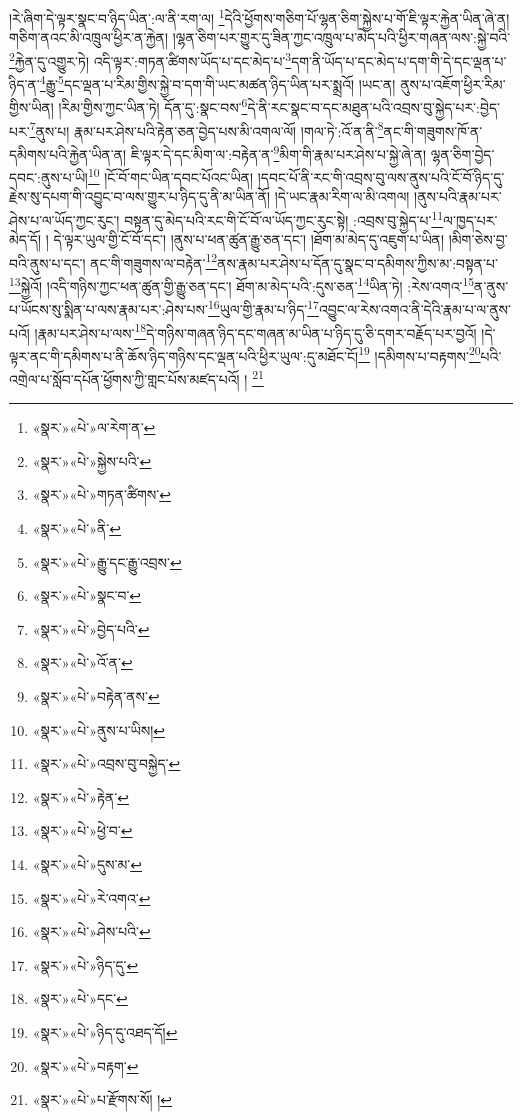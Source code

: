 །རེ་ཞིག་དེ་ལྟར་སྣང་བ་ཉིད་ཡིན་:ལ་ནི་རག་ལ། \footnote{«སྣར་»«པེ་»ལ་རེག་ན་}དེའི་ཕྱོགས་གཅིག་པོ་ལྷན་ཅིག་སྐྱེས་པ་གོ་ཇི་ལྟར་རྐྱེན་ཡིན་ཞེ་ན། གཅིག་ནའང་མི་འཁྲུལ་ཕྱིར་ན་རྐྱེན། །ལྷན་ཅིག་པར་གྱུར་དུ་ཟིན་ཀྱང་འཁྲུལ་པ་མེད་པའི་ཕྱིར་གཞན་ལས་:སྐྱེ་བའི་\footnote{«སྣར་»«པེ་»སྐྱེས་པའི་}རྐྱེན་དུ་འགྱུར་ཏེ། འདི་ལྟར་:གཏན་ཚིགས་ཡོད་པ་དང་མེད་པ་\footnote{«སྣར་»«པེ་»གཏན་ཚིགས་}དག་ནི་ཡོད་པ་དང་མེད་པ་དག་གི་དེ་དང་ལྡན་པ་ཉིད་ན་\footnote{«སྣར་»«པེ་»ནི་}རྒྱུ་\footnote{«སྣར་»«པེ་»རྒྱུ་དང་རྒྱུ་འབྲས་}དང་ལྡན་པ་རིམ་གྱིས་སྐྱེ་བ་དག་གི་ཡང་མཚན་ཉིད་ཡིན་པར་སྨྲའོ། །ཡང་ན། ནུས་པ་འཇོག་ཕྱིར་རིམ་གྱིས་ཡིན། །རིམ་གྱིས་ཀྱང་ཡིན་ཏེ། དོན་དུ་:སྣང་བས་\footnote{«སྣར་»«པེ་»སྣང་བ་}དེ་ནི་རང་སྣང་བ་དང་མཐུན་པའི་འབྲས་བུ་སྐྱེད་པར་:བྱེད་པར་\footnote{«སྣར་»«པེ་»བྱེད་པའི་}ནུས་པ། རྣམ་པར་ཤེས་པའི་རྟེན་ཅན་བྱེད་པས་མི་འགལ་ལོ། །གལ་ཏེ་:འོ་ན་ནི་\footnote{«སྣར་»«པེ་»འོ་ན་}ནང་གི་གཟུགས་ཁོ་ན་དམིགས་པའི་རྐྱེན་ཡིན་ན། ཇི་ལྟར་དེ་དང་མིག་ལ་:བརྟེན་ན་\footnote{«སྣར་»«པེ་»བརྟེན་ནས་}མིག་གི་རྣམ་པར་ཤེས་པ་སྐྱེ་ཞེ་ན། ལྷན་ཅིག་བྱེད་དབང་:ནུས་པ་ཡི།\footnote{«སྣར་»«པེ་»ནུས་པ་ཡིས།} །ངོ་བོ་གང་ཡིན་དབང་པོའང་ཡིན། །དབང་པོ་ནི་རང་གི་འབྲས་བུ་ལས་ནུས་པའི་ངོ་བོ་ཉིད་དུ་རྗེས་སུ་དཔག་གི་འབྱུང་བ་ལས་གྱུར་པ་ཉིད་དུ་ནི་མ་ཡིན་ནོ། །དེ་ཡང་རྣམ་རིག་ལ་མི་འགལ། །ནུས་པའི་རྣམ་པར་ཤེས་པ་ལ་ཡོད་ཀྱང་རུང་། བསྟན་དུ་མེད་པའི་རང་གི་ངོ་བོ་ལ་ཡོད་ཀྱང་རུང་སྟེ། :འབྲས་བུ་སྐྱེད་པ་\footnote{«སྣར་»«པེ་»འབྲས་བུ་བསྐྱེད་}ལ་ཁྱད་པར་མེད་དོ། །
དེ་ལྟར་ཡུལ་གྱི་ངོ་བོ་དང་། །ནུས་པ་ཕན་ཚུན་རྒྱུ་ཅན་དང་། །ཐོག་མ་མེད་དུ་འཇུག་པ་ཡིན། །མིག་ཅེས་བྱ་བའི་ནུས་པ་དང་། ནང་གི་གཟུགས་ལ་བརྟེན་\footnote{«སྣར་»«པེ་»རྟེན་}ནས་རྣམ་པར་ཤེས་པ་དོན་དུ་སྣང་བ་དམིགས་ཀྱིས་མ་:བསྟན་པ་\footnote{«སྣར་»«པེ་»ཕྱེ་བ་}སྐྱེའོ། །འདི་གཉིས་ཀྱང་ཕན་ཚུན་གྱི་རྒྱུ་ཅན་དང་། ཐོག་མ་མེད་པའི་:དུས་ཅན་\footnote{«སྣར་»«པེ་»དུས་མ་}ཡིན་ཏེ། :རེས་འགའ་\footnote{«སྣར་»«པེ་»རེ་འགའ་}ན་ནུས་པ་ཡོངས་སུ་སྨིན་པ་ལས་རྣམ་པར་:ཤེས་པས་\footnote{«སྣར་»«པེ་»ཤེས་པའི་}ཡུལ་གྱི་རྣམ་པ་ཉིད་\footnote{«སྣར་»«པེ་»ཉིད་དུ་}འབྱུང་ལ་རེས་འགའ་ནི་དེའི་རྣམ་པ་ལ་ནུས་པའོ། །རྣམ་པར་ཤེས་པ་ལས་\footnote{«སྣར་»«པེ་»དང་}དེ་གཉིས་གཞན་ཉིད་དང་གཞན་མ་ཡིན་པ་ཉིད་དུ་ཅི་དགར་བརྗོད་པར་བྱའོ། །དེ་ལྟར་ནང་གི་དམིགས་པ་ནི་ཆོས་ཉིད་གཉིས་དང་ལྡན་པའི་ཕྱིར་ཡུལ་:དུ་མཐོང་ངོ།\footnote{«སྣར་»«པེ་»ཉིད་དུ་འཐད་དོ།} །དམིགས་པ་བརྟགས་\footnote{«སྣར་»«པེ་»བརྟག་}པའི་འགྲེལ་པ་སློབ་དཔོན་ཕྱོགས་ཀྱི་གླང་པོས་མཛད་པའོ། ། \footnote{«སྣར་»«པེ་»པ་རྫོགས་སོ། ། }